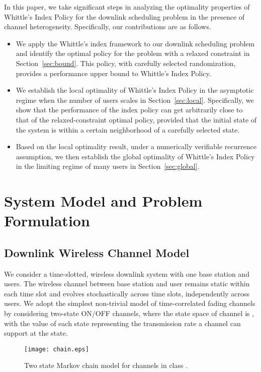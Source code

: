\documentclass[11pt,twocolumn]{IEEEtran}
\begin{document}
In this paper, we take significant steps in analyzing the optimality
properties of Whittle's Index Policy for the downlink scheduling
problem in the presence of channel heterogeneity. Specifically, our contributions are as follows.

\begin{itemize}
\item We apply the Whittle's index framework to our downlink scheduling problem and identify the optimal policy for the problem with a relaxed constraint in Section~\ref{sec:bound}. This policy, with carefully selected randomization, provides a performance upper bound to Whittle's Index Policy.

\item We establish the local optimality of Whittle's Index Policy in the asymptotic regime when the number of users scales in Section~\ref{sec:local}. Specifically, we show that the performance of the index policy can get arbitrarily close to that of the relaxed-constraint optimal policy, provided that the initial state of the system is within a certain neighborhood of a carefully selected state.

\item Based on the local optimality result, under a numerically verifiable recurrence assumption, we then establish the global optimality of Whittle's Index Policy in the limiting regime of many users in Section~\ref{sec:global}.
\end{itemize}

\section{System Model and Problem Formulation}
\label{sec:model}

\subsection{Downlink Wireless Channel Model}

We consider a time-slotted, wireless downlink system with one base
station and  users. The wireless channel  between base
station and user  remains static within each time slot  and
evolves stochastically across time slots, independently across
users. We adopt the simplest non-trivial model of time-correlated
fading channels by considering two-state ON/OFF channels, where the
state space of channel  is , with
the value of each state representing the transmission rate a channel
can support at the state.
\begin{figure}
\centering
\texttt{[image: chain.eps]}
\caption{Two state Markov chain model for channels in class .}
\label{fig:chain}
\end{figure}
\end{document}
